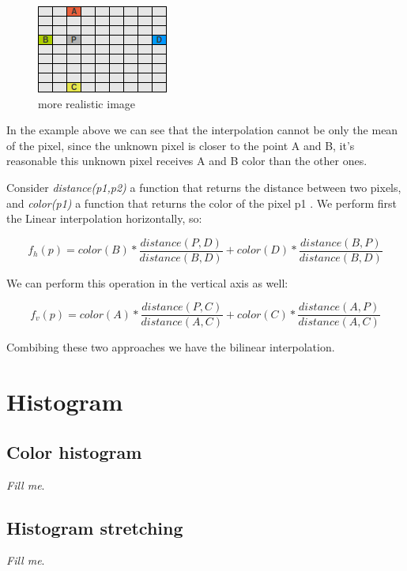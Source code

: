 \documentclass{article}
\begin{document}
	\begin{figure} [H]
		\centering
		\includegraphics[scale=1]{images/bilinear_interpolation_3}
		\caption{more realistic image\label{bilinear3}}
	\end{figure}
	
	In the example above we can see that the interpolation cannot be only the mean of the pixel, since the unknown pixel is closer to the point A and B, it's reasonable 
	this unknown pixel receives A and B color than the other ones.

	Consider \textit{distance(p1,p2)} a function that returns the distance between two pixels, 
	and \textit{color(p1)} a function that returns the color of the pixel p1 . We perform first the Linear interpolation horizontally, so:

	\[ f_h(p)=color(B)*\frac{distance(P,D)}{distance(B,D)}+color(D)*\frac{distance(B,P)}{distance(B,D)}  \]

	We can perform this operation in the vertical axis as well:

	\[ f_v(p)=color(A)*\frac{distance(P,C)}{distance(A,C)}+color(C)*\frac{distance(A,P)}{distance(A,C)}  \]

	Combibing these two approaches we have the bilinear interpolation.

	
\section{Histogram}

	\subsection{Color histogram}

		\textit{Fill me}.

	\subsection{Histogram stretching}

		\textit{Fill me}.
\end{document}
